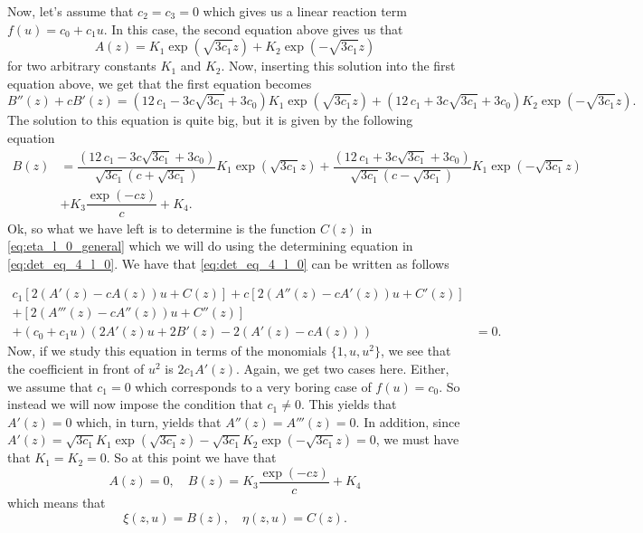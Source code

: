 Now, let's assume that $c_2=c_3=0$ which gives us a linear reaction term $f(u)=c_{0}+c_{1}u$. In this case, the second equation above gives us that
$$A{(z)}=K_1\exp{(\sqrt{3c_1}z)}+K_2\exp{(-\sqrt{3c_1}z)}$$
for two arbitrary constants $K_1$ and $K_2$. Now, inserting this solution into the first equation above, we get that the first equation becomes
$$B''(z)+cB'(z)=\left(12\,c_1-3c\sqrt{3c_1}+3c_{0}\right)K_1\exp{(\sqrt{3c_1}z)}+\left(12\,c_1+3c\sqrt{3c_1}+3c_{0}\right)K_2\exp{(-\sqrt{3c_1}z)}.$$
The solution to this equation is quite big, but it is given by the following equation
\begin{equation}
  \begin{split}
    B(z)&=\dfrac{\left(12\,c_1-3c\sqrt{3c_1}+3c_0\right)}{\sqrt{3c_1}(c+\sqrt{3c_1})}K_{1}\exp{\left(\sqrt{3c_1}z\right)}+\dfrac{\left(12\,c_1+3c\sqrt{3c_1}+3c_0\right)}{\sqrt{3c_1}(c-\sqrt{3c_1})}K_{1}\exp{\left(-\sqrt{3c_1}z\right)}\\
    &+K_{3}\dfrac{\exp{\left(-cz\right)}}{c}+K_4.
   \end{split}
  \label{eq:solution_B}
\end{equation}
Ok, so what we have left is to determine is the function $C(z)$ in \eqref{eq:eta_l_0_general} which we will do using the determining equation in \eqref{eq:det_eq_4_l_0}. We have that \eqref{eq:det_eq_4_l_0} can be written as follows

\begin{equation}
  \begin{split}
    c_1\left[2(A'(z)-cA(z))u+C(z)\right]+c\left[2(A''(z)-cA'(z))u+C'(z)\right]&\\
    +\left[2(A'''(z)-cA''(z))u+C''(z)\right]&\\
    +\left(c_{0}+c_{1}u\right)(2A'(z)u+2B'(z)-2(A'(z)-cA(z)))&=0.
  \end{split}
  \label{eq:det_eq_4_RD_almost_done}
\end{equation}
Now, if we study this equation in terms of the monomials $\{1,u,u^{2}\}$, we see that the coefficient in front of $u^2$ is $2c_{1}A'{(z)}$. Again, we get two cases here. Either, we assume that $c_{1}=0$ which corresponds to a very boring case of $f(u)=c_0$. So instead we will now impose the condition that $c_1\neq 0$. This yields that $A'{(z)}=0$ which, in turn, yields that $A''{(z)}=A'''{(z)}=0$. In addition, since $A'{(z)}=\sqrt{3c_1}K_1\exp{(\sqrt{3c_1}z)}-\sqrt{3c_1}K_2\exp{(-\sqrt{3c_1}z)}=0$, we must have that $K_1=K_2=0$. So at this point we have that
$$A(z)=0,\quad B(z)=K_{3}\dfrac{\exp{\left(-cz\right)}}{c}+K_4$$
which means that
$$\xi{(z,u)}=B(z),\quad \eta{(z,u)}=C(z).$$



